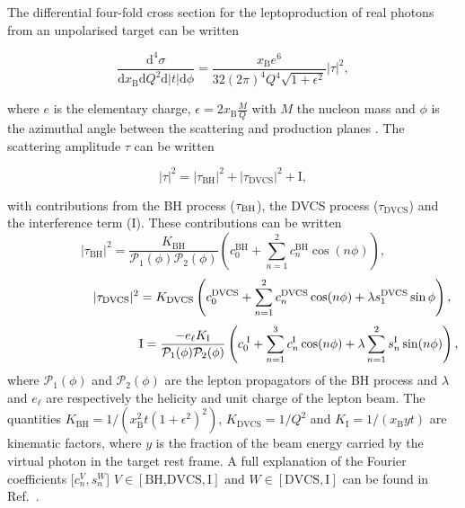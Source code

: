 The differential four-fold cross section for the leptoproduction of real photons
from an unpolarised target can be written \cite{Bel02b}
\begin{center}
\begin{equation}
\frac{\textrm{d}^4\sigma}{\textrm{d}x_{\textrm{B}}\textrm{d}Q^{2}\textrm{d}
|t|\textrm{d}\phi} =
\frac{x_{\textrm{B}}e^{6}}{32(2\pi)^{4} Q^{4}\sqrt{1+\epsilon^{2}}}
|\tau|^{2},
\end{equation}
\end{center}
where $e$ is the elementary
charge, $\epsilon=2x_\textrm{B}\frac{M}{Q}$ with $M$
the nucleon mass and $\phi$ is the
azimuthal angle between the scattering and production planes \cite{Tre04}.
The scattering amplitude $\tau$ can be written
\begin{center}
\begin{equation}
|\tau|^{2} = |\tau_{\textrm{BH}}|^{2} +
|\tau_{\textrm{DVCS}}|^{2} + \textrm{I},
\end{equation}
\end{center}
with contributions from the \textrm{BH} process ($\tau_{\textrm{\textrm{BH}}}$),
the DVCS process
($\tau_{\textrm{DVCS}}$) and the interference term (I). These
contributions can be written 
\begin{equation}
 |\tau_{\textrm{BH}}|^{2} =
\frac{K_{\textrm{BH}}}{\mathcal{P}_{1}(\phi)\mathcal{P}_{2}(\phi)}
\left(c_{0}^{
\textrm{BH}} + \sum_{n=1}^2 c_{n}^{\textrm{BH}}\cos(n\phi)\right),
\label{e:tbh}
\end{equation}
\begin{equation}
 \hspace{2.2cm}|\tau_{\textrm{DVCS}}|^{2} =
K_{\textrm{DVCS}}\left(c_{0}^{\textrm{DVCS}} +
\sum_{n=1}^2
c_{n}^{\textrm{DVCS}}\cos(n\phi) + \lambda
s_{1}^{\textrm{DVCS}}\sin\phi\right),
\label{e:tdvcs}
\end{equation}
\begin{equation}
\hspace{3.7cm} \textrm{I} = \frac{- e_\ell
K_{\textrm{I}}}{\mathcal{P}_{1}(\phi)\mathcal{P}_{2}(\phi)}\left(c_{0}^{\textrm{
I}}
+
\sum_{n=1}^3 c_{n}^{\textrm{I}}\cos(n\phi) + \lambda \sum_{n=1}^2
s_{n}^{\textrm{I}}\sin(n\phi)\right),
\label{e:ti}
\end{equation}
where $\mathcal{P}_1(\phi)$ and $\mathcal{P}_2(\phi)$ are the lepton propagators
of the BH process and $\lambda$ and $e_\ell$ are respectively the
helicity and unit charge of the lepton beam.  The
quantities $K_{\textrm{BH}}=1/(x_\textrm{B}^2t(1+\epsilon^2)^2)$,
$K_{\textrm{DVCS}}=1/Q^2$
and $K_{\textrm{I}}=1/(x_{\textrm{B}}yt)$ are kinematic factors, where
$y$ is the fraction of the beam energy carried by the virtual photon in
the target rest frame. A full
explanation of the Fourier coefficients [$c_n^V,s_n^W$]
\blue{(}$V\in[\textrm{BH,DVCS},\textrm{I}]$ and $W\in[\textrm{DVCS},\textrm{I}]$\blue{)} can be
found in
Ref.~\cite{Bel02b}.

